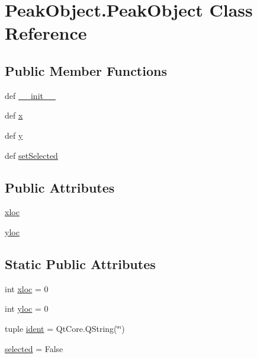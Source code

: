 \hypertarget{class_peak_object_1_1_peak_object}{\section{Peak\-Object.\-Peak\-Object Class Reference}
\label{class_peak_object_1_1_peak_object}
}
\subsection*{Public Member Functions}
\begin{DoxyCompactItemize}
\item 
def \hyperlink{class_peak_object_1_1_peak_object_a066c72d23958912081182a5aca95e32c}{\-\_\-\-\_\-init\-\_\-\-\_\-}
\item 
def \hyperlink{class_peak_object_1_1_peak_object_a44e1f82c79582b10885050ae8ffd7201}{x}
\item 
def \hyperlink{class_peak_object_1_1_peak_object_a674a319850462abc76a7091e49c2425c}{y}
\item 
def \hyperlink{class_peak_object_1_1_peak_object_a4a9dabf7ebe3b0703da235f77259d5d2}{set\-Selected}
\end{DoxyCompactItemize}
\subsection*{Public Attributes}
\begin{DoxyCompactItemize}
\item 
\hyperlink{class_peak_object_1_1_peak_object_a0675bfef330cb0e7111c507d0fd2f505}{xloc}
\item 
\hyperlink{class_peak_object_1_1_peak_object_adc5441b9bde0d002725032741bce8a3a}{yloc}
\end{DoxyCompactItemize}
\subsection*{Static Public Attributes}
\begin{DoxyCompactItemize}
\item 
int \hyperlink{class_peak_object_1_1_peak_object_a547374a82aab09bcf28e13ecfb598117}{xloc} = 0
\item 
int \hyperlink{class_peak_object_1_1_peak_object_abebfb4985f9b0b73e6b1e20cb5a56f18}{yloc} = 0
\item 
tuple \hyperlink{class_peak_object_1_1_peak_object_a5d69241780c9ba49bccd1a76c3ef2738}{ident} = Qt\-Core.\-Q\-String(\char`\"{}\char`\"{})
\item 
\hyperlink{class_peak_object_1_1_peak_object_aa0095eabde0eeb9ed146a052f7dea921}{selected} = False
\end{DoxyCompactItemize}


